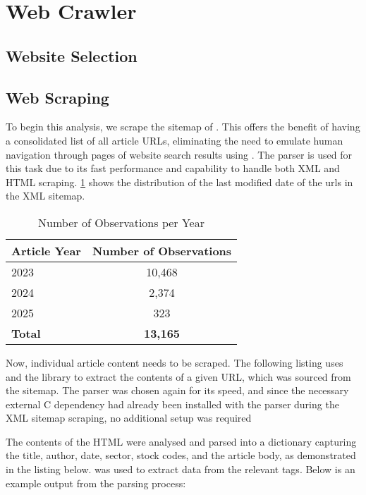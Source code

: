 \section{Web Crawler}

\subsection{Website Selection}



\subsection{Web Scraping}

To begin this analysis, we scrape the sitemap of . This offers the benefit of having a consolidated list of all article URLs, eliminating the need to emulate human navigation through pages of website search results using . The  parser is used for this task due to its fast performance and capability to handle both XML and HTML scraping. \cref{tab:xml_article_counts} shows the distribution of the last modified date of the urls in the XML sitemap. 


\begin{table}[h]
    \centering
    \begin{tabular}{lc}
        \toprule
        \textbf{Article Year} & \textbf{Number of Observations} \\
        \midrule
        2023 & 10,468 \\
        2024 & 2,374 \\
        2025 & 323 \\
        \midrule
        \textbf{Total} & \textbf{13,165} \\
        \bottomrule
    \end{tabular}
    \caption{Number of Observations per Year}
    \label{tab:xml_article_counts}
\end{table}


Now, individual article content needs to be scraped. The following listing uses  and the  library to extract the contents of a given URL, which was sourced from the sitemap. The  parser was chosen again for its speed, and since the necessary external C dependency had already been installed with the  parser during the XML sitemap scraping, no additional setup was required \cite{beautiful_soup_documentation}

The contents of the HTML were analysed and parsed into a dictionary capturing the title, author, date, sector, stock codes, and the article body, as demonstrated in the listing below.  was used to extract data from the relevant tags. Below is an example output from the parsing process:

